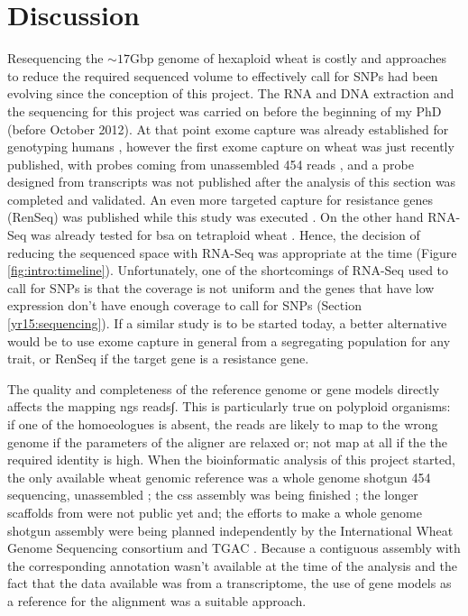 \section{Discussion} 


Resequencing the $\sim17$Gbp genome of hexaploid wheat is costly and approaches to reduce the required sequenced volume to effectively call for SNPs had been evolving since the conception of this project. 
The RNA and DNA extraction and the sequencing for this project was carried on before the beginning of my PhD (before October 2012). 
At that point exome capture was already established for genotyping humans \citep{Ng2009}, however the first exome capture on wheat was just recently published, with probes coming from unassembled 454 reads \citep{Winfield2012}, and a probe designed from transcripts \citep{Henry2014} was not published after the analysis of this section was completed and validated.
An even more targeted capture for resistance genes (RenSeq) was published while this study was executed \citep{Jupe2013}.
On the other hand RNA-Seq was already tested for \acrlong{bsa} on tetraploid wheat \citep{Trick2012}.  
Hence, the decision of reducing the sequenced space with RNA-Seq was appropriate at the time (Figure \ref{fig:intro:timeline}). 
Unfortunately, one of the shortcomings of RNA-Seq used to call for SNPs is that the coverage is not uniform and the genes that have low expression don't have enough coverage to call for SNPs (Section  \ref{yr15:sequencing}).
If a similar study is to be started today, a better alternative would be to use exome capture in general from a segregating population for any trait, or RenSeq if the target gene is a resistance gene. 


The quality and completeness  of the reference genome or gene models directly affects the mapping \acrshort{ngs} reads∫. 
This is particularly true on polyploid organisms: if one of the homoeologues is absent, the reads are likely to map to the wrong genome if the parameters of the aligner are relaxed or; not map at all if the the required identity is high.
When the bioinformatic analysis of this project started, the only available wheat genomic reference was a whole genome shotgun 454 sequencing, unassembled \citep{Brenchley2012}; the \gls{css} assembly was being finished \citep{Mayer2014}; the longer scaffolds from \citet{Chapman2015} were not public yet and; the efforts to make a whole genome shotgun assembly were being planned independently by the International Wheat Genome Sequencing consortium  \citep{Pozniak2016} and TGAC \citep{Clark2016}.  
Because a contiguous assembly with the corresponding annotation wasn't available at the time of the analysis and the fact that the data available was from a transcriptome, the use of gene models as a reference for the alignment was a suitable approach. 

